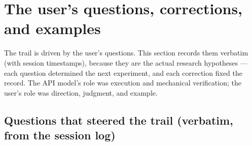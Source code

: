 \documentclass[sigplan,10pt,anonymous,review]{acmart}
\begin{document}
\section{The user's questions, corrections, and examples}

The trail is driven by the user's questions. This section records them
verbatim (with session timestamps), because they are the actual research
hypotheses --- each question determined the next experiment, and each
correction fixed the record. The API model's role was execution and
mechanical verification; the user's role was direction, judgment, and
example.

\subsection{Questions that steered the trail (verbatim, from the session log)}
\end{document}
